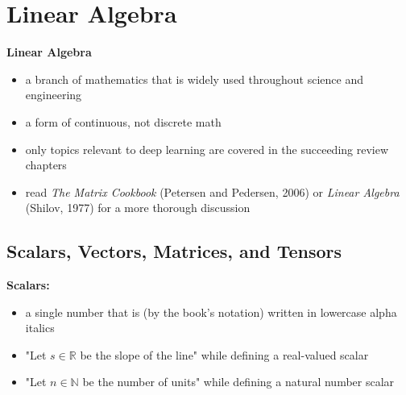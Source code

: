 \documentclass[11pt,twocolumn]{report}
\def\realnumbers{\mathbb{R}}
\def\naturalnumbers{\mathbb{N}}
\begin{document}
\chapter{Linear Algebra}

\textbf{Linear Algebra}
\begin{itemize}
  \item a branch of mathematics that is widely used throughout science and
    engineering
  \item a form of continuous, not discrete math
  \item only topics relevant to deep learning are covered in the succeeding
    review chapters
  \item read \textit{The Matrix Cookbook} (Petersen and Pedersen, 2006) or
    \textit{Linear Algebra} (Shilov, 1977) for a more thorough discussion
\end{itemize}

\section{Scalars, Vectors, Matrices, and Tensors}

\large\textbf{Scalars:}
\begin{itemize}
  \item a single number that is (by the book's notation) written in lowercase
    alpha italics
  \item "Let $ s \in \realnumbers $ be the slope of the line" while defining a
    real-valued scalar
  \item "Let $ n \in \naturalnumbers $ be the number of units" while defining a
    natural number scalar
\end{itemize}
\end{document}
